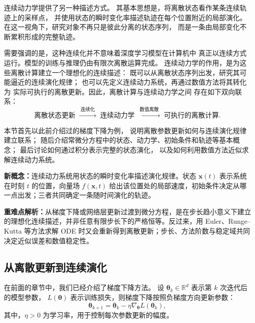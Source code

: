 连续动力学提供了另一种描述方式。
其基本思想是，将离散状态看作某条连续轨迹上的采样点，
并使用状态的瞬时变化率描述轨迹在每个位置附近的局部演化。
在这一视角下，研究对象不再只是彼此分离的状态序列，
而是一条由局部变化不断累积形成的完整轨迹。

需要强调的是，这种连续化并不意味着深度学习模型在计算机中
真正以连续方式运行。模型的训练与推理仍由有限次离散运算完成。
连续动力学的作用，是为这些离散计算建立一个理想化的连续描述：
既可以从离散状态序列出发，研究其可能逼近的连续演化规律；
也可以先定义连续动力系统，再通过数值方法将其转化为
实际可执行的离散更新。因此，离散计算与连续动力学之间
存在如下双向联系：
\begin{equation}
    \text{离散状态更新}
    \;\xrightarrow{\;\text{连续化}\;}\;
    \text{连续动力学}
    \;\xrightarrow{\;\text{数值离散}\;}\;
    \text{可执行的离散计算}.
    \label{eq:discrete-continuous-discrete}
\end{equation}

本节首先以此前介绍过的梯度下降为例，
说明离散参数更新如何与连续演化规律建立联系；
随后介绍常微分方程中的状态、动力学、初始条件和轨迹等基本概念；
最后讨论如何通过积分表示完整的状态演化，
以及如何利用数值方法近似求解连续动力系统。

\begin{importantnote}
\textbf{新概念：}连续动力系统用状态的瞬时变化率描述演化规律。状态 \(\boldsymbol{x}(t)\) 表示系统在时刻 \(t\) 的位置，向量场 \(f(\boldsymbol{x},t)\) 给出该位置处的局部速度，初始条件决定从哪一点出发；三者共同确定一条随时间演化的轨迹。

\textbf{重难点解析：}从梯度下降或网络层更新过渡到微分方程，是在步长趋小意义下建立的理想化连续描述，并非任意有限步长下的严格恒等。反过来，用 Euler、Runge--Kutta 等方法求解 ODE 时又会重新得到离散更新；步长、方法阶数与稳定域共同决定近似误差和数值稳定性。
\end{importantnote}


\subsection{从离散更新到连续演化}
\label{subsec:discrete-to-continuous-evolution}

在前面的章节中，我们已经介绍了梯度下降方法。
设
\(\boldsymbol{\theta}_k\in\mathbb{R}^{d}\)
表示第 \(k\) 次迭代后的模型参数，
\(L(\boldsymbol{\theta})\)
表示训练损失，则梯度下降按照负梯度方向更新参数：
\begin{equation}
    \boldsymbol{\theta}_{k+1}
    =
    \boldsymbol{\theta}_k
    -
    \eta
    \nabla_{\boldsymbol{\theta}}
    L(\boldsymbol{\theta}_k),
    \label{eq:gradient-descent}
\end{equation}
其中，\(\eta>0\) 为学习率，用于控制每次参数更新的幅度。

